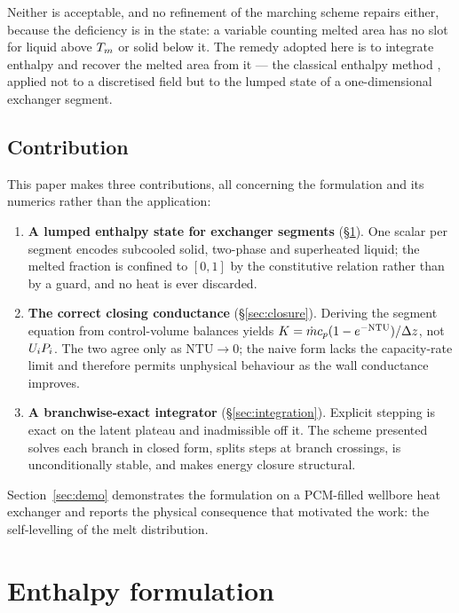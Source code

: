 Neither is acceptable, and no refinement of the marching scheme repairs either,
because the deficiency is in the state: a variable counting melted area has no
slot for liquid above $T_{m}$ or solid below it. The remedy adopted here is to
integrate enthalpy and recover the melted area from it --- the classical
enthalpy method \cite{Voller1987,Alexiades1993}, applied not to a discretised
field but to the lumped state of a one-dimensional exchanger segment.

\subsection{Contribution}

This paper makes three contributions, all concerning the formulation and its
numerics rather than the application:

\begin{enumerate}[leftmargin=1.8em,itemsep=3pt]
\item \textbf{A lumped enthalpy state for exchanger segments}
  (\S\ref{sec:formulation}). One scalar per segment encodes subcooled solid,
  two-phase and superheated liquid; the melted fraction is confined to $[0,1]$
  by the constitutive relation rather than by a guard, and no heat is ever
  discarded.
\item \textbf{The correct closing conductance} (\S\ref{sec:closure}). Deriving
  the segment equation from control-volume balances yields
  $K=\dot m c_{p}(1-e^{-\mathrm{NTU}})/\Delta z$, not $U_{i} P_{i}$. The two agree
  only as $\mathrm{NTU}\to0$; the naive form lacks the capacity-rate limit and
  therefore permits unphysical behaviour as the wall conductance improves.
\item \textbf{A branchwise-exact integrator} (\S\ref{sec:integration}).
  Explicit stepping is exact on the latent plateau and inadmissible off it. The
  scheme presented solves each branch in closed form, splits steps at branch
  crossings, is unconditionally stable, and makes energy closure structural.
\end{enumerate}

\noindent
Section~\ref{sec:demo} demonstrates the formulation on a PCM-filled wellbore
heat exchanger and reports the physical consequence that motivated the work: the
self-levelling of the melt distribution.

\section{Enthalpy formulation}
\label{sec:formulation}

